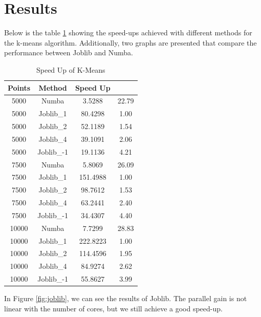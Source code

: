 \documentclass[10pt,twocolumn,letterpaper]{article}
\begin{document}
\section{Results}
Below is the table \ref{tab:speedup_kmeans} showing the speed-ups achieved with different methods for the k-means algorithm. Additionally, two graphs are presented that compare the performance between Joblib and Numba.

\begin{table}[h]
	\centering
	\caption{Speed Up of K-Means}
	\begin{tabular}{@{}cccc@{}}
		\toprule
		Points & Method      & Speed Up \\ \midrule
		5000   & Numba       & 3.5288   & 22.79    \\
		5000   & Joblib\_1   & 80.4298    & 1.00     \\
		5000   & Joblib\_2   & 52.1189      & 1.54     \\
		5000   & Joblib\_4   & 39.1091       & 2.06     \\
		5000   & Joblib\_-1  & 19.1136   & 4.21     \\
		7500   & Numba       & 5.8069         & 26.09    \\
		7500   & Joblib\_1   & 151.4988               & 1.00     \\
		7500   & Joblib\_2   & 98.7612            & 1.53     \\
		7500   & Joblib\_4   & 63.2441              & 2.40     \\
		7500   & Joblib\_-1  & 34.4307         & 4.40     \\
		10000  & Numba       & 7.7299           & 28.83    \\
		10000  & Joblib\_1   & 222.8223         & 1.00     \\
		10000  & Joblib\_2   & 114.4596           & 1.95     \\
		10000  & Joblib\_4   & 84.9274                & 2.62     \\
		10000  & Joblib\_-1  & 55.8627            & 3.99     \\ \bottomrule
	\end{tabular}
	\label{tab:speedup_kmeans}
\end{table}

In Figure \ref{fig:joblib}, we can see the results of Joblib. The parallel gain is not linear with the number of cores, but we still achieve a good speed-up.
\end{document}
